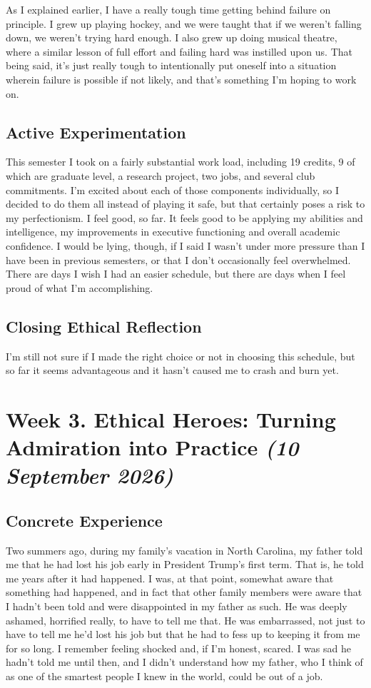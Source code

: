 \documentclass[12pt,stu,biblatex]{apa7}
\begin{document}
As I explained earlier, I have a really tough time getting behind failure on principle.
I grew up playing hockey, and we were taught that if we weren't falling down, we weren't trying hard enough.
I also grew up doing musical theatre, where a similar lesson of full effort and failing hard was instilled upon us.
That being said, it's just really tough to intentionally put oneself into a situation wherein failure is possible if not likely, and that's something I'm hoping to work on.

\subsection{Active Experimentation}
This semester I took on a fairly substantial work load, including 19 credits, 9 of which are graduate level, a research project, two jobs, and several club commitments.
I'm excited about each of those components individually, so I decided to do them all instead of playing it safe, but that certainly poses a risk to my perfectionism.
I feel good, so far.
It feels good to be applying my abilities and intelligence, my improvements in executive functioning and overall academic confidence.
I would be lying, though, if I said I wasn't under more pressure than I have been in previous semesters, or that I don't occasionally feel overwhelmed.
There are days I wish I had an easier schedule, but there are days when I feel proud of what I'm accomplishing.

\subsection{Closing Ethical Reflection}
I'm still not sure if I made the right choice or not in choosing this schedule, but so far it seems advantageous and it hasn't caused me to crash and burn yet.

\section{Week 3. Ethical Heroes: Turning Admiration into Practice \textit{(10 September 2026)}}

\subsection{Concrete Experience}
Two summers ago, during my family's vacation in North Carolina, my father told me that he had lost his job early in President Trump's first term.
That is, he told me years after it had happened.
I was, at that point, somewhat aware that something had happened, and in fact that other family members were aware that I hadn't been told and were disappointed in my father as such.
He was deeply ashamed, horrified really, to have to tell me that.
He was embarrassed, not just to have to tell me he'd lost his job but that he had to fess up to keeping it from me for so long.
I remember feeling shocked and, if I'm honest, scared.
I was sad he hadn't told me until then, and I didn't understand how my father, who I think of as one of the smartest people I knew in the world, could be out of a job.
\end{document}
